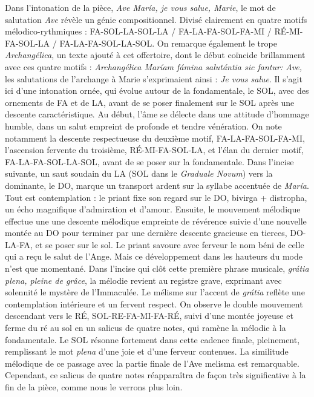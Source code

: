 \documentclass[Session2026.tex]{subfiles}
\begin{document}
Dans l'intonation de la pièce, \emph{Ave María, je vous salue, Marie},
le mot de salutation \emph{Ave} révèle un génie compositionnel. Divisé
clairement en quatre motifs mélodico-rythmiques : FA-SOL-LA-SOL-LA /
FA-LA-FA-SOL-FA-MI / RÉ-MI-FA-SOL-LA / FA-LA-FA-SOL-LA-SOL. On remarque
également le trope \emph{Archangélica}, un texte ajouté à cet
offertoire, dont le début coïncide brillamment avec ces quatre motifs :
\emph{Archangélica Maríam fámina salutántia sic fantur: Ave,} les
salutations de l'archange à Marie s'exprimaient ainsi : \emph{Je vous
salue}. Il s'agit ici d'une intonation ornée, qui évolue autour de la
fondamentale, le SOL, avec des ornements de FA et de LA, avant de se
poser finalement sur le SOL après une descente caractéristique. Au
début, l'âme se délecte dans une attitude d'hommage humble, dans un
salut empreint de profonde et tendre vénération. On note notamment la
descente respectueuse du deuxième motif, FA-LA-FA-SOL-FA-MI, l'ascension
fervente du troisième, RÉ-MI-FA-SOL-LA, et l'élan du dernier motif,
FA-LA-FA-SOL-LA-SOL, avant de se poser sur la fondamentale. Dans
l'incise suivante, un saut soudain du LA (SOL dans le \emph{Graduale
Novum}) vers la dominante, le DO, marque un transport ardent sur la
syllabe accentuée de \emph{María}. Tout est contemplation : le priant
fixe son regard sur le DO, bivirga + distropha, un écho magnifique
d'admiration et d'amour. Ensuite, le mouvement mélodique effectue une
une descente mélodique empreinte de révérence suivie d'une nouvelle
montée au DO pour terminer par une dernière descente gracieuse en
tierces, DO-LA-FA, et se poser sur le sol. Le priant savoure avec
ferveur le nom béni de celle qui a reçu le salut de l'Ange. Mais ce
développement dans les hauteurs du mode n'est que momentané. Dans
l'incise qui clôt cette première phrase musicale, \emph{grátia plena,
pleine de grâce}, la mélodie revient au registre grave, exprimant avec
solennité le mystère de l'Immaculée. Le mélisme sur l'accent de
\emph{grátia} reflète une contemplation intérieure et un fervent
respect. On observe le double mouvement descendant vers le RÉ,
SOL-RE-FA-MI-FA-RÉ, suivi d'une montée joyeuse et ferme du ré au sol en
un salicus de quatre notes, qui ramène la mélodie à la fondamentale. Le
SOL résonne fortement dans cette cadence finale, pleinement, remplissant
le mot \emph{plena} d'une joie et d'une ferveur contenues. La similitude
mélodique de ce passage avec la partie finale de l'Ave melisma est
remarquable. Cependant, ce salicus de quatre notes réapparaîtra de façon
très significative à la fin de la pièce, comme nous le verrons plus
loin.
\end{document}
